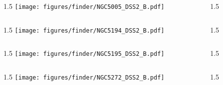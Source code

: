 \documentclass[final]{beamer}
\newlength{\colwidth}
\begin{document}

\begin{frame}[t]{}
    \begin{columns}[T]
        \begin{column}{1.5\colwidth}
            \centering
            \texttt{[image: figures/finder/NGC5005\_DSS2\_B.pdf]}
        \end{column}
        \begin{column}{1.5\colwidth}
            \Large
            
        \end{column}
    \end{columns}
    \vspace{\fill}
    \begin{columns}[T]
        \begin{column}{1.5\colwidth}
            \centering
            \texttt{[image: figures/finder/NGC5194\_DSS2\_B.pdf]}
        \end{column}
        \begin{column}{1.5\colwidth}
            \Large
            
        \end{column}
    \end{columns}
\end{frame}


\begin{frame}[t]{}
    \begin{columns}[T]
        \begin{column}{1.5\colwidth}
            \centering
            \texttt{[image: figures/finder/NGC5195\_DSS2\_B.pdf]}
        \end{column}
        \begin{column}{1.5\colwidth}
            \Large
            
        \end{column}
    \end{columns}
    \vspace{\fill}
    \begin{columns}[T]
        \begin{column}{1.5\colwidth}
            \centering
            \texttt{[image: figures/finder/NGC5272\_DSS2\_B.pdf]}
        \end{column}
        \begin{column}{1.5\colwidth}
            \Large
            
        \end{column}
    \end{columns}
\end{frame}
\end{document}
